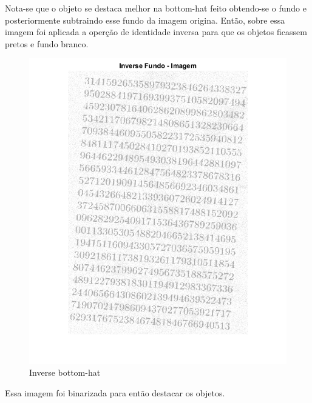\documentclass[journal]{IEEEtran}
\begin{document}
Nota-se que o objeto se destaca melhor na bottom-hat feito obtendo-se o fundo e posteriormente subtraindo esse fundo da imagem origina. Então, sobre essa imagem foi aplicada a operção de identidade inversa para que os objetos ficassem pretos e fundo branco.

\begin{figure}[!htb]
	\centering
	\includegraphics[scale=0.25]{q1-bh2-i.png}
	\caption{Inverse bottom-hat}
	\label{Original}
\end{figure}

Essa imagem foi binarizada para então destacar os objetos.
\end{document}
